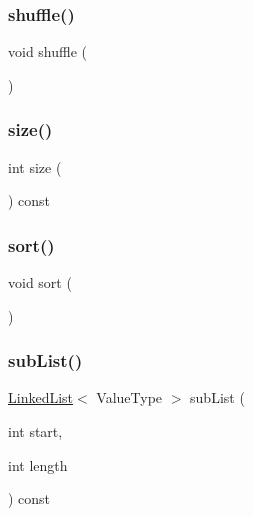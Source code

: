\mbox{\label{classLinkedList_a1905fe84eb39f020b32c58baf7a76758}} 
\subsubsection{\texorpdfstring{shuffle()}{shuffle()}}
{\footnotesize\ttfamily void shuffle (\begin{DoxyParamCaption}{ }\end{DoxyParamCaption})}

\mbox{\label{classLinkedList_af9593d4a5ff4274efaf429cb4f9e57cc}} 
\subsubsection{\texorpdfstring{size()}{size()}}
{\footnotesize\ttfamily int size (\begin{DoxyParamCaption}{ }\end{DoxyParamCaption}) const}

\mbox{\label{classLinkedList_a47fdc9eea42b6975cdc835bb2e08810e}} 
\subsubsection{\texorpdfstring{sort()}{sort()}}
{\footnotesize\ttfamily void sort (\begin{DoxyParamCaption}{ }\end{DoxyParamCaption})}

\mbox{\label{classLinkedList_a1524b4e899bf6d7b9db87243f3be0c1b}} 
\subsubsection{\texorpdfstring{sub\+List()}{subList()}}
{\footnotesize\ttfamily \mbox{\hyperlink{classLinkedList}{Linked\+List}}$<$ Value\+Type $>$ sub\+List (\begin{DoxyParamCaption}\item[{int}]{start,  }\item[{int}]{length }\end{DoxyParamCaption}) const}

